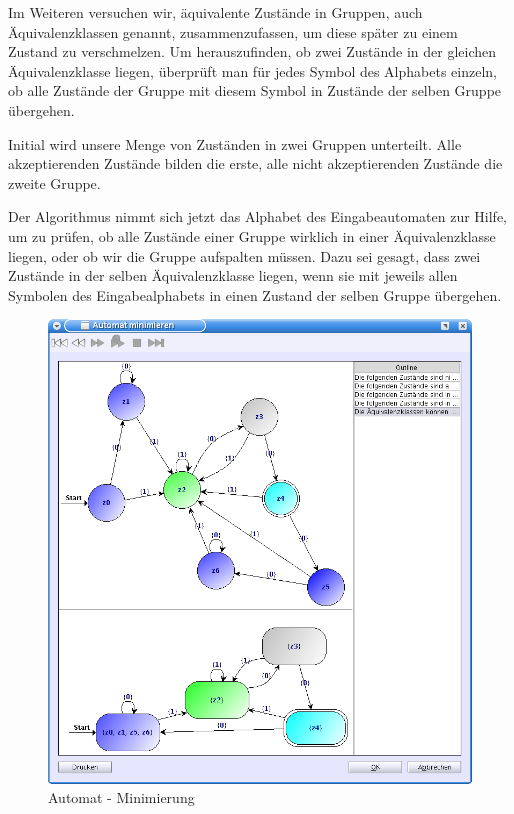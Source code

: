Im Weiteren versuchen wir, äquivalente Zustände in Gruppen, auch
Äquivalenz\-klassen genannt, zusammenzufassen, um diese später zu einem Zustand
zu verschmelzen. Um herauszufinden, ob zwei Zustände in der gleichen
Äquivalenz\-klasse liegen, überprüft man für jedes Symbol des Alphabets
einzeln, ob alle Zustände der Gruppe mit diesem Symbol in Zustände der selben
Gruppe übergehen.\vspace{10pt}

Initial wird unsere Menge von Zuständen in zwei Gruppen unterteilt. Alle
akzeptierenden Zustände bilden die erste, alle nicht akzeptierenden Zustände die
zweite Gruppe.\vspace{10pt}

Der Algorithmus nimmt sich jetzt das Alphabet des Eingabeautomaten zur Hilfe, um
zu prüfen, ob alle Zustände einer Gruppe wirklich in einer Äquivalenzklasse
liegen, oder ob wir die Gruppe aufspalten müssen. Dazu sei gesagt, dass zwei
Zustände in der selben Äquivalenzklasse liegen, wenn sie mit jeweils allen
Symbolen des Eingabealphabets in einen Zustand der selben Gruppe
übergehen.\vspace{10pt}

\begin{figure}[h]
\begin{center}
\includegraphics[width=12cm]{../images/minimize.png}
\caption{Automat - Minimierung}
\label{FigureMinimization}
\end{center}
\end{figure}
\vspace{10pt}

